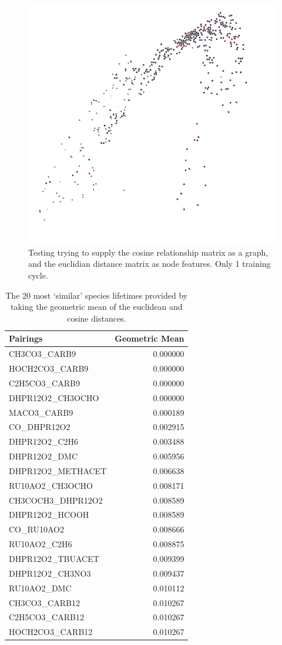 \documentclass{pasa}%
\begin{document}
\begin{figure}[H]
\includegraphics[width=.5\textwidth]{fig/aedist.png}
\caption{Testing trying to supply the cosine relationship matrix as a graph, and the euclidian distance matrix as node features. Only 1 training cycle.}
\end{figure}

\begin{table}
\centering
\begin{tabular}{lr}
\toprule
Pairings &  Geometric Mean \\
\midrule
CH3CO3\_CARB9      &        0.000000 \\
HOCH2CO3\_CARB9    &        0.000000 \\
C2H5CO3\_CARB9     &        0.000000 \\
DHPR12O2\_CH3OCHO  &        0.000000 \\
MACO3\_CARB9       &        0.000189 \\
CO\_DHPR12O2       &        0.002915 \\
DHPR12O2\_C2H6     &        0.003488 \\
DHPR12O2\_DMC      &        0.005956 \\
DHPR12O2\_METHACET &        0.006638 \\
RU10AO2\_CH3OCHO   &        0.008171 \\
CH3COCH3\_DHPR12O2 &        0.008589 \\
DHPR12O2\_HCOOH    &        0.008589 \\
CO\_RU10AO2        &        0.008666 \\
RU10AO2\_C2H6      &        0.008875 \\
DHPR12O2\_TBUACET  &        0.009399 \\
DHPR12O2\_CH3NO3   &        0.009437 \\
RU10AO2\_DMC       &        0.010112 \\
CH3CO3\_CARB12     &        0.010267 \\
C2H5CO3\_CARB12    &        0.010267 \\
HOCH2CO3\_CARB12   &        0.010267 \\
\bottomrule
\end{tabular}\caption{The 20 most `similar' species lifetimes provided by taking the geometric mean of the euclidean and cosine distances.}
\end{table}
\end{document}
